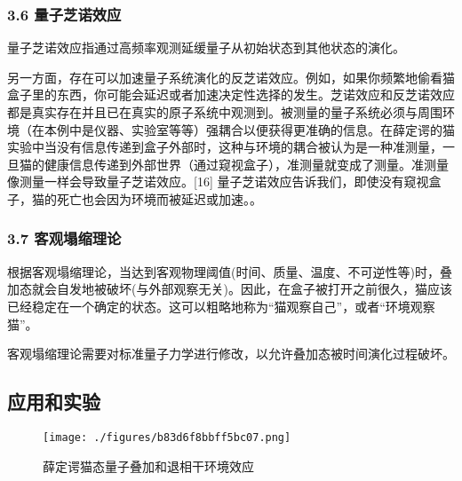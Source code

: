 \subsubsection{3.6 量子芝诺效应}
量子芝诺效应指通过高频率观测延缓量子从初始状态到其他状态的演化。

另一方面，存在可以加速量子系统演化的反芝诺效应。例如，如果你频繁地偷看猫盒子里的东西，你可能会延迟或者加速决定性选择的发生。芝诺效应和反芝诺效应都是真实存在并且已在真实的原子系统中观测到。被测量的量子系统必须与周围环境（在本例中是仪器、实验室等等）强耦合以便获得更准确的信息。在薛定谔的猫实验中当没有信息传递到盒子外部时，这种与环境的耦合被认为是一种准测量，一旦猫的健康信息传递到外部世界（通过窥视盒子），准测量就变成了测量。准测量像测量一样会导致量子芝诺效应。[16] 量子芝诺效应告诉我们，即使没有窥视盒子，猫的死亡也会因为环境而被延迟或加速。。

\subsubsection{3.7 客观塌缩理论}
根据客观塌缩理论，当达到客观物理阈值(时间、质量、温度、不可逆性等)时，叠加态就会自发地被破坏(与外部观察无关)。因此，在盒子被打开之前很久，猫应该已经稳定在一个确定的状态。这可以粗略地称为“猫观察自己”，或者“环境观察猫”。

客观塌缩理论需要对标准量子力学进行修改，以允许叠加态被时间演化过程破坏。

\subsection{应用和实验}
\begin{figure}[ht]
\centering
\texttt{[image: ./figures/b83d6f8bbff5bc07.png]}
\caption{薛定谔猫态量子叠加和退相干环境效应} \label{fig_XDEDM_5}
\end{figure}

